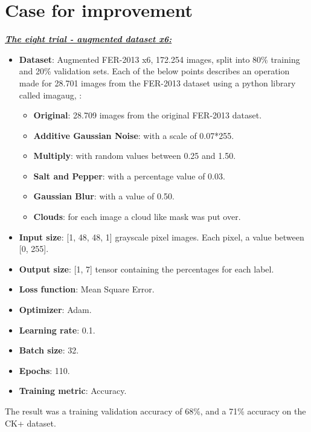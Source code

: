 \documentclass[runningheads,a4paper,11pt]{report}
\begin{document}
\section{Case for improvement}
\label{section:cfi}
\underline{\textbf{\emph{The eight trial - augmented dataset x6:}}}
\begin{itemize}
	\item \textbf{Dataset}: Augmented FER-2013 x6, 172.254 images, split into 80\% training and 20\% validation sets. Each of the below points describes an operation made for 28.701 images from the FER-2013 dataset using a python library called imagaug, \cite{imgaug}:
	\begin{itemize}
		\item \textbf{Original}: 28.709 images from the original FER-2013 dataset.
		\item \textbf{Additive Gaussian Noise}: with a scale of 0.07*255.
		\item \textbf{Multiply}: with random values between 0.25 and 1.50.
		\item \textbf{Salt and Pepper}: with a percentage value of 0.03.
		\item \textbf{Gaussian Blur}: with a value of 0.50.
		\item \textbf{Clouds}: for each image a cloud like mask was put over.
	\end{itemize}
	\item \textbf{Input size}: [1, 48, 48, 1] grayscale pixel images. Each pixel, a value between [0, 255].
	\item \textbf{Output size}: [1, 7] tensor containing the percentages for each label.
	\item \textbf{Loss function}: Mean Square Error.
	\item \textbf{Optimizer}: Adam.
	\item \textbf{Learning rate}: 0.1.
	\item \textbf{Batch size}: 32.
	\item \textbf{Epochs}: 110.
	\item \textbf{Training metric}: Accuracy.
\end{itemize}
The result was a training validation accuracy of 68\%, and a 71\% accuracy on the CK+ dataset.
\end{document}
